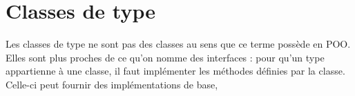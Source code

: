\section{ Classes de type}
\label{sec:typeclasses}

Les classes de type ne sont pas des classes au sens que ce terme possède en POO.
Elles sont plus proches de ce qu'on nomme des interfaces : pour qu'un type
appartienne à une classe, il faut implémenter les méthodes définies par la classe.
Celle-ci peut fournir des implémentations de base,
